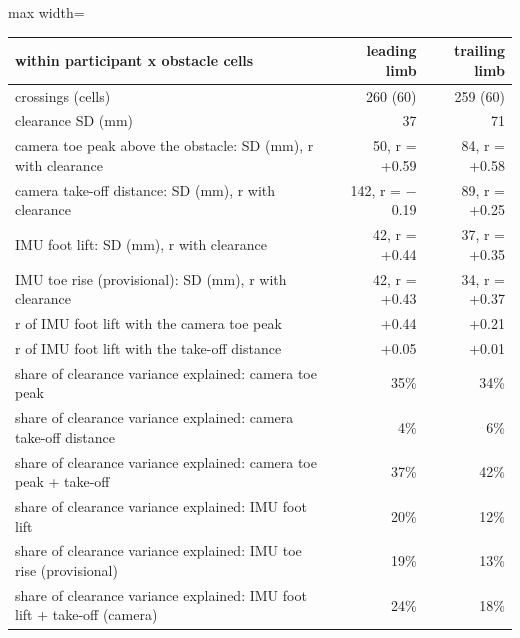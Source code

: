 \begin{adjustbox}{max width=\textwidth}
{\footnotesize
\begin{tabular}{p{9.4cm}rr}
\toprule
\textbf{within participant x obstacle cells} & \textbf{leading limb} & \textbf{trailing limb} \\
\midrule
crossings (cells) & 260 (60) & 259 (60) \\
clearance SD (mm) & 37 & 71 \\
camera toe peak above the obstacle: SD (mm), r with clearance & 50, r = +0.59 & 84, r = +0.58 \\
camera take-off distance: SD (mm), r with clearance & 142, r = $-$0.19 & 89, r = +0.25 \\
IMU foot lift: SD (mm), r with clearance & 42, r = +0.44 & 37, r = +0.35 \\
IMU toe rise (provisional): SD (mm), r with clearance & 42, r = +0.43 & 34, r = +0.37 \\
r of IMU foot lift with the camera toe peak & +0.44 & +0.21 \\
r of IMU foot lift with the take-off distance & +0.05 & +0.01 \\
share of clearance variance explained: camera toe peak & 35\% & 34\% \\
share of clearance variance explained: camera take-off distance & 4\% & 6\% \\
share of clearance variance explained: camera toe peak + take-off & 37\% & 42\% \\
share of clearance variance explained: IMU foot lift & 20\% & 12\% \\
share of clearance variance explained: IMU toe rise (provisional) & 19\% & 13\% \\
share of clearance variance explained: IMU foot lift + take-off (camera) & 24\% & 18\% \\
\bottomrule
\end{tabular}
}
\end{adjustbox}
